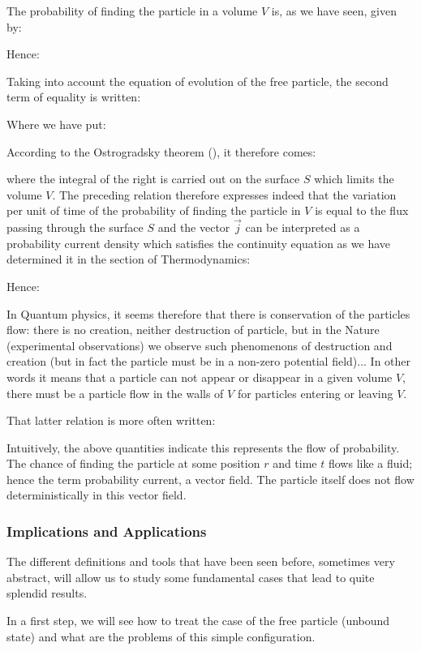 	The probability of finding the particle in a volume $V$ is, as we have seen, given by:
	
	Hence:
	
	Taking into account the equation of evolution of the free particle, the second term of equality is written:
	
	Where we have put:
	
	According to the Ostrogradsky theorem (), it therefore comes:
	
	where the integral of the right is carried out on the surface $S$ which limits the volume $V$. The preceding relation therefore expresses indeed that the variation per unit of time of the probability of finding the particle in $V$ is equal to the flux passing through the surface $S$ and the vector $\vec{j}$ can be interpreted as a probability current density which satisfies the continuity equation as we have determined it in the section of Thermodynamics:
	
	Hence:
	
	In Quantum physics, it seems therefore that there is conservation of the particles flow: there is no creation, neither destruction of particle, but in the Nature (experimental observations) we observe such phenomenons of destruction and creation (but in fact the particle must be in a non-zero potential field)... In other words it means that a particle can not appear or disappear in a given volume $V$, there must be a particle flow in the walls of $V$ for particles entering or leaving $V$.
	
	That latter relation is more often written:
	
	Intuitively, the above quantities indicate this represents the flow of probability. The chance of finding the particle at some position $r$ and time $t$ flows like a fluid; hence the term probability current, a vector field. The particle itself does not flow deterministically in this vector field.
	
	\subsubsection{Implications and Applications}
	The different definitions and tools that have been seen before, sometimes very abstract, will allow us to study some fundamental cases that lead to quite splendid results.

	In a first step, we will see how to treat the case of the free particle (unbound state) and what are the problems of this simple configuration.

